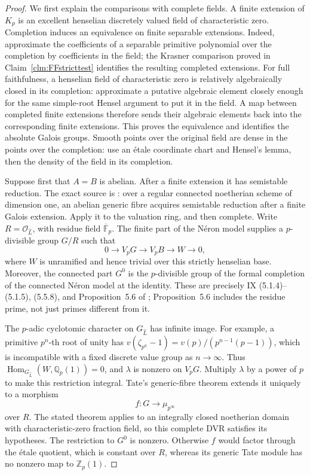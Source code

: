 \begin{proof}
We first explain the comparisons with complete fields.
A finite extension of \(K_p\) is an excellent henselian
discretely valued field of characteristic zero. Completion
induces an equivalence on finite separable extensions.
Indeed, approximate the coefficients of a separable primitive
polynomial over the completion by coefficients in the field;
the Krasner comparison proved in
Claim~\ref{clm:FFstricttest} identifies the resulting completed
extensions. For full faithfulness, a henselian field of
characteristic zero is relatively algebraically closed in its
completion: approximate a putative algebraic element closely
enough for the same simple-root Hensel argument to put it in
the field. A map between completed finite extensions therefore
sends their algebraic elements back into the corresponding
finite extensions. This proves the equivalence and identifies
the absolute Galois groups. Smooth points over the original
field are dense in the points over the completion: use an
\'etale coordinate chart and Hensel's lemma, then the density
of the field in its completion.

Suppose first that \(A=B\) is abelian. After a finite extension
it has semistable reduction. The exact source is
\citet[IX, Theorem~3.6]{FF_SGA7I1972}: over a regular connected
noetherian scheme of dimension one, an abelian generic fibre
acquires semistable reduction after a finite Galois extension.
Apply it to the valuation ring, and then complete. Write
\(R=\mathcal O_{\widehat L}\), with residue field
\(\overline{\mathbb F}_p\). The finite part of the N\'eron
model supplies a \(p\)-divisible group \(G/R\) such that
\[
 0\longrightarrow V_pG\longrightarrow V_pB
       \longrightarrow W\longrightarrow0,             \tag{FF.25.2}
\]
where \(W\) is unramified and hence trivial over this
strictly henselian base. Moreover, the connected part
\(G^0\) is the \(p\)-divisible group of the formal
completion of the connected N\'eron model at the identity.
These are precisely
IX (5.1.4)--(5.1.5), (5.5.8), and Proposition~5.6 of
\cite{FF_SGA7I1972}; Proposition~5.6 includes the residue
prime, not just primes different from it.

The \(p\)-adic cyclotomic character on \(G_{\widehat L}\)
has infinite image. For example, a primitive
\(p^n\)-th root of unity has
\(v(\zeta_{p^n}-1)=v(p)/(p^{n-1}(p-1))\), which is
incompatible with a fixed discrete value group as
\(n\to\infty\). Thus
\(\operatorname{Hom}_{G_{\widehat L}}(W,\mathbb Q_p(1))=0\),
and \(\lambda\) is nonzero on \(V_pG\).
Multiply \(\lambda\) by a power of \(p\) to make this
restriction integral. Tate's generic-fibre theorem
\citep[Theorem~4 and Corollary~1]{FF_Tate1967} extends it
uniquely to a morphism
\[
                       f:G\longrightarrow\mu_{p^\infty}
\]
over \(R\). The stated theorem applies to an integrally
closed noetherian domain with characteristic-zero fraction
field, so this complete DVR satisfies its hypotheses.
The restriction to \(G^0\) is nonzero. Otherwise \(f\)
would factor through the \'etale quotient, which is constant
over \(R\), whereas its generic Tate module has no nonzero
map to \(\mathbb Z_p(1)\).


\end{proof}

